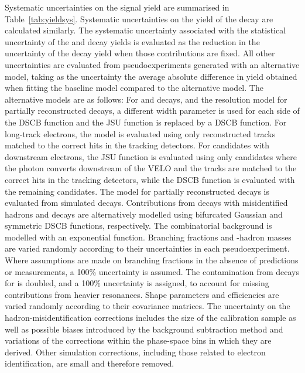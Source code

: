 Systematic uncertainties on the signal yield are summarised in Table~\ref{tab:yieldsys}.
Systematic uncertainties on the yield of the \bdkpig decay are calculated similarly.
The systematic uncertainty associated with the statistical uncertainty of the \bskkg and \lbpkg decay yields is evaluated as the reduction in the uncertainty of the \bskpig decay yield when those contributions are fixed.
All other uncertainties are evaluated from pseudoexperiments generated with an alternative model, taking as the uncertainty the average absolute difference in yield obtained when fitting the baseline model compared to the alternative model.
The alternative models are as follows:
For \bdskpig and \mbox{\decay{\BdorBsorbar}{\Kstarzbv\ep\en}} decays, and the resolution model for partially reconstructed decays, a different width parameter is used for each side of the DSCB function and the JSU function is replaced by a DSCB function.
For long-track electrons, the model is evaluated using only reconstructed tracks matched to the correct hits in the tracking detectors.
For candidates with downstream electrons, the JSU function is evaluated using only candidates where the photon converts downstream of the VELO and the tracks are matched to the correct hits in the tracking detectors, while the DSCB function is evaluated with the remaining candidates.
The model for partially reconstructed \mbox{\decay{\B}{\Km\pip\pi\gamma}} decays is evaluated from simulated \mbox{} decays.
Contributions from decays with misidentified hadrons and \mbox{\decay{\BdorBsorbar}{\Kstarzbv\pip\pim}} decays are alternatively modelled using bifurcated Gaussian and symmetric DSCB functions, respectively.
The combinatorial background is modelled with an exponential function.
Branching fractions and \bquark-hadron masses are varied randomly according to their uncertainties in each pseudoexperiment.
Where assumptions are made on branching fractions in the absence of predictions or measurements, a 100\% uncertainty is assumed.
The contamination from \mbox{} decays for \mkpihigh is doubled, and a 100\% uncertainty is assigned, to account for missing contributions from heavier resonances.
Shape parameters and efficiencies are varied randomly according to their covariance matrices.
The uncertainty on the hadron-misidentification corrections includes the size of the calibration sample as well as possible biases introduced by the background subtraction method and variations of the corrections within the phase-space bins in which they are derived.
Other simulation corrections, including those related to electron identification, are small and therefore removed.

